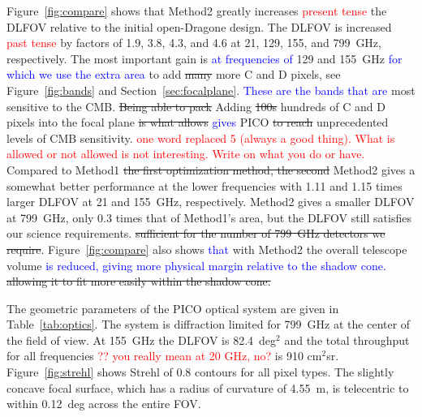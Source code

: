 \documentclass[]{spie}  %
\newcommand{\comr}[1]{\textcolor{red}{#1}}
\newcommand{\comb}[1]{\textcolor{blue}{#1}}
\begin{document}
Figure~\ref{fig:compare} shows that Method2 greatly increases \comr{present tense} the DLFOV relative to the initial open-Dragone design.  
The DLFOV is increased \comr{past tense} by factors of 1.9, 3.8, 4.3, and 4.6 at 21, 129, 155, and 799~GHz, respectively.  
The most important gain is \comb{at frequencies of }129 and 155~GHz \comb{for which we use the extra area} to add 
\sout{many} more C and D pixels, see Figure~\ref{fig:bands} and Section~\ref{sec:focalplane}. \comb{These are the bands 
that are} most sensitive to the CMB. 
\sout{Being able to pack} Adding \sout{100s} hundreds of C and D pixels into the focal plane \sout{is what allows} 
\comb{gives} PICO \sout{to reach}  unprecedented levels of CMB sensitivity. 
\comr{one word replaced 5 (always a good thing). What is allowed or not allowed is not interesting. Write on what you do or have.}
Compared to Method1 \sout{the first optimization method, the second} Method2 gives a somewhat better performance at the lower 
frequencies with 1.11 and 1.15 times larger DLFOV at 21 and 155~GHz, respectively.
Method2 gives a smaller DLFOV at 799~GHz, only 0.3 times that of Method1's area, but the DLFOV still satisfies our science 
requirements. \sout{sufficient for the number of 799~GHz detectors we require}. 
Figure~\ref{fig:compare} also shows \comb{that} with Method2 the overall telescope volume \comb{is reduced, giving more 
physical margin relative to the shadow cone.} 
\sout{allowing it to fit more easily within the shadow cone. }

The geometric parameters of the PICO optical system are given in Table~\ref{tab:optics}. The 
system is diffraction limited for 799~GHz at the center of the field of view. At 155~GHz the 
DLFOV is 82.4~deg$^2$ and the total throughput for all frequencies \comr{?? you really mean at 20 GHz, no?} is 910 cm$^2$sr. 
Figure~\ref{fig:strehl} shows Strehl of 0.8 contours for all pixel types.
The slightly concave focal surface, which has a radius of curvature of 4.55~m, is telecentric to 
within 0.12~deg across the entire FOV.
\end{document}
